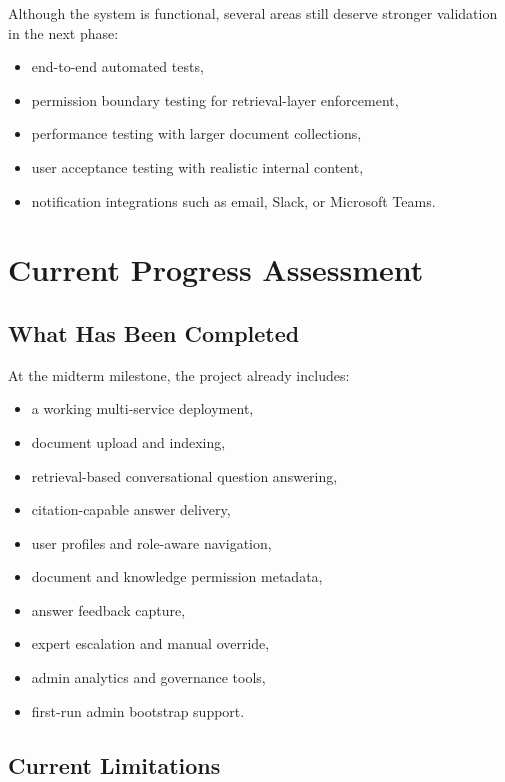 \documentclass[12pt,a4paper]{report}
\begin{document}
Although the system is functional, several areas still deserve stronger validation in the next phase:
\begin{itemize}[leftmargin=1.5em]
\item end-to-end automated tests,
\item permission boundary testing for retrieval-layer enforcement,
\item performance testing with larger document collections,
\item user acceptance testing with realistic internal content,
\item notification integrations such as email, Slack, or Microsoft Teams.
\end{itemize}

\chapter{Current Progress Assessment}

\section{What Has Been Completed}

At the midterm milestone, the project already includes:
\begin{itemize}[leftmargin=1.5em]
\item a working multi-service deployment,
\item document upload and indexing,
\item retrieval-based conversational question answering,
\item citation-capable answer delivery,
\item user profiles and role-aware navigation,
\item document and knowledge permission metadata,
\item answer feedback capture,
\item expert escalation and manual override,
\item admin analytics and governance tools,
\item first-run admin bootstrap support.
\end{itemize}

\section{Current Limitations}
\end{document}
